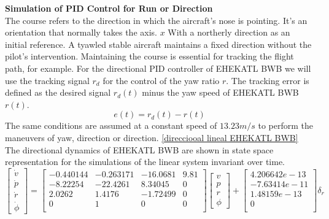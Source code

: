 \textbf{Simulation of PID Control for Run or Direction}\\
The course refers to the direction in which the aircraft's nose is pointing. It's an orientation that normally takes the axis. $x$ With a northerly direction as an initial reference. A tyawled stable aircraft maintains a fixed direction without the pilot’s intervention. Maintaining the course is essential for tracking the flight path, for example. For the directional PID controller of EHEKATL BWB we will use the tracking signal $r_d$ for the control of the yaw ratio $r$. The tracking error is defined as the desired signal  $r_d(t)$ minus the yaw speed of EHEKATL BWB $r(t)$. 
\begin{equation}
    e(t) = r_d (t) - r(t)
\end{equation}
The same conditions are assumed at a constant speed of $13.23 m/s$ to perform the maneuvers of yaw, direction or direction. \ref{direcciooal lineal EHEKATL BWB} The directional dynamics of EHEKATL BWB are shown in state space representation for the simulations of the linear system invariant over time. 
\begin{equation}
\label{direcciooal lineal EHEKATL BWB}
    \begin{bmatrix}
        \dot v \\
        \dot p \\
        \dot r \\
        \dot \phi
    \end{bmatrix}
    =
    \begin{bmatrix}
    -0.440144 & -0.263171 & -16.0681 & 9.81 \\
    -8.22254 & -22.4261 & 8.34045 & 0 \\
    2.0262 & 1.4176 &-1.72499 & 0 \\
    0 & 1 & 0 & 0 \\
    \end{bmatrix}
    \begin{bmatrix}
        v \\
        p \\
        r \\
        \phi
    \end{bmatrix}
    +
    \begin{bmatrix}
    4.206642e-13 \\
    -7.63414e-11 \\
    1.48159e-13 \\
    0 \\
    \end{bmatrix}
    \delta_r
\end{equation}

